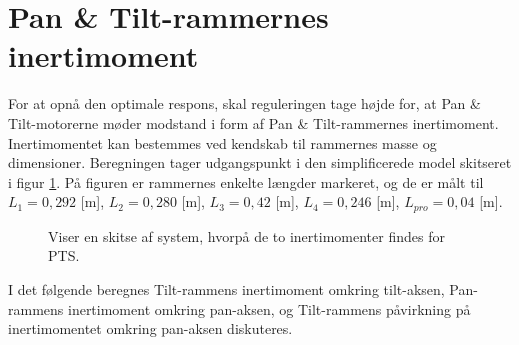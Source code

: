 \section{Pan \& Tilt-rammernes inertimoment}
\label{sec:teo_PTS}
For at opnå den optimale respons, skal reguleringen tage højde for, at Pan \& Tilt-motorerne møder modstand i form af
Pan \& Tilt-rammernes inertimoment. Inertimomentet kan bestemmes ved kendskab til rammernes
masse og dimensioner. Beregningen tager udgangspunkt i den simplificerede model skitseret i figur \ref{fig:inerti_PTS}.
På figuren er rammernes enkelte længder markeret, og de er målt til \({L_{1}} =0,292\) [m],
\({L_{2}} =0,280\) [m], \({L_{3}}= 0,42\) [m], \({L_{4}} =0,246\) [m], \({L_{pro}}=0,04\) [m].
\begin{figure}[!th]
\centering
\begin{tikzpicture}[scale=0.8]

\end{tikzpicture}
\caption[Skitse af PTS]{Viser en skitse af system, hvorpå de to inertimomenter findes for PTS.}
\label{fig:inerti_PTS}
\end{figure}

I det følgende beregnes Tilt-rammens inertimoment omkring tilt-aksen,
Pan-rammens inertimoment omkring pan-aksen,
og Tilt-rammens påvirkning på inertimomentet omkring pan-aksen diskuteres.

